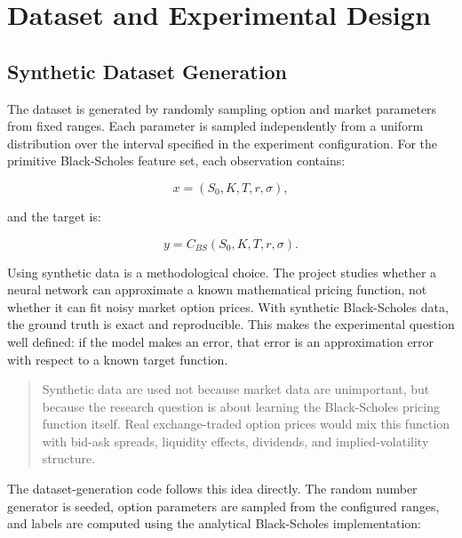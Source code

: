 \chapter{Dataset and Experimental Design}

\section{Synthetic Dataset Generation}

The dataset is generated by randomly sampling option and market parameters from fixed ranges.
Each parameter is sampled independently from a uniform distribution over the interval specified in the experiment configuration.
For the primitive Black-Scholes feature set, each observation contains:

\begin{equation}
    x = (S_0, K, T, r, \sigma),
\end{equation}

and the target is:

\begin{equation}
    y = C_{BS}(S_0, K, T, r, \sigma).
\end{equation}

Using synthetic data is a methodological choice.
The project studies whether a neural network can approximate a known mathematical pricing function, not whether it can fit noisy market option prices.
With synthetic Black-Scholes data, the ground truth is exact and reproducible.
This makes the experimental question well defined: if the model makes an error, that error is an approximation error with respect to a known target function.

\begin{quote}
    Synthetic data are used not because market data are unimportant, but because the research question is about learning the Black-Scholes pricing function itself.
    Real exchange-traded option prices would mix this function with bid-ask spreads, liquidity effects, dividends, and implied-volatility structure.
\end{quote}

The dataset-generation code follows this idea directly.
The random number generator is seeded, option parameters are sampled from the configured ranges, and labels are computed using the analytical Black-Scholes implementation:

